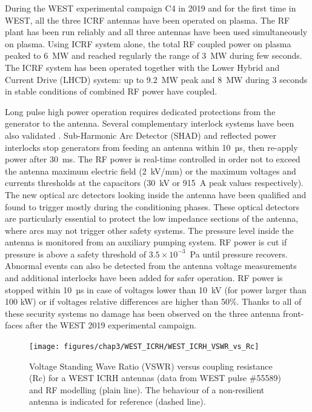 {During the WEST experimental campaign C4 in 2019 and for the first time in WEST, all the three ICRF antennas have been operated on plasma. The RF plant has been run reliably and all three antennas have been used simultaneously on plasma. Using ICRF system alone, the total RF coupled power on plasma peaked to 6~MW and reached regularly the range of 3~MW during few seconds. The ICRF system has been operated together with the Lower Hybrid and Current Drive (LHCD) system: up to 9.2~MW peak and 8~MW during 3 seconds in stable conditions of combined RF power have coupled.

Long pulse high power operation requires dedicated protections from the generator to the antenna. Several complementary interlock systems have been also validated . Sub-Harmonic Arc Detector (SHAD) and reflected power interlocks stop generators from feeding an antenna within 10~µs, then re-apply power after 30~ms. The RF power is real-time controlled in order not to exceed the antenna maximum electric field (2~kV/mm) or the maximum voltages and currents thresholds at the capacitors (30~kV or 915~A peak values respectively). The new optical arc detectors looking inside the antenna have been qualified and found to trigger mostly during the conditioning phases. These optical detectors are particularly essential to protect the low impedance sections of the antenna, where arcs may not trigger other safety systems. The pressure level inside the antenna is monitored from an auxiliary pumping system.  RF power is cut if pressure is above a safety threshold of $3.5\times10^{-3}$~Pa until pressure recovers. Abnormal events can also be detected from the antenna voltage measurements and additional interlocks have been added for safer operation. RF power is stopped within 10~µs in case of voltages lower than 10~kV (for power larger than 100 kW) or if voltages relative differences are higher than 50\%. Thanks to all of these security systems no damage has been observed on the three antenna front-faces after the WEST 2019 experimental campaign.

\begin{figure}[h]
	\centering
	\texttt{[image: figures/chap3/WEST\_ICRH/WEST\_ICRH\_VSWR\_vs\_Rc]}
	\caption{Voltage Standing Wave Ratio (VSWR) versus coupling resistance (Rc) for a WEST ICRH antennas (data from WEST pulse \#55589) and RF modelling (plain line). The behaviour of a non-resilient antenna is indicated for reference (dashed line).}
	\label{fig:westicrhvswrvsrc}
\end{figure}

}
